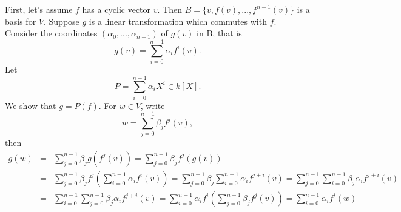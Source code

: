 \documentclass[12pt]{article}
\begin{document}
First, let's assume $f$ has a cyclic vector $v$. Then $B=\{v,f(v),...,f^{n-1}(v)\}$ is a basis for $V$. Suppose $g$ is a linear transformation which commutes with $f$. Consider the coordinates $(\alpha_{0},...,\alpha_{n-1})$ of $g(v)$ in B, that is $$g(v)=\sum_{i=0}^{n-1}\alpha_{i}f^{i}(v).$$ 
Let $$P=\sum_{i=0}^{n-1}\alpha_{i}X^{i} \in k[X].$$ We show that $g=P(f)$. 
For $w \in V$, write $$w=\sum_{j=0}^{n-1}\beta_{j}f^{j}(v),$$ then
\begin{eqnarray*}
g(w) &=& \sum_{j=0}^{n-1}\beta_{j}g(f^{j}(v)) = \sum_{j=0}^{n-1}\beta_{j}f^{j}(g(v)) \\
&=& \sum_{j=0}^{n-1}\beta_{j}f^{j}(\sum_{i=0}^{n-1}\alpha_{i}f^{i}(v))  
= \sum_{j=0}^{n-1}\beta_{j}\sum_{i=0}^{n-1}\alpha_{i}f^{j+i}(v)
= \sum_{j=0}^{n-1}\sum_{i=0}^{n-1}\beta_{j}\alpha_{i}f^{j+i}(v) \\
&=& \sum_{i=0}^{n-1}\sum_{j=0}^{n-1}\beta_{j}\alpha_{i}f^{j+i}(v)
= \sum_{i=0}^{n-1}\alpha_{i}f^{i}(\sum_{j=0}^{n-1}\beta_{j}f^{j}(v)) 
= \sum_{i=0}^{n-1}\alpha_{i}f^{i}(w)
\end{eqnarray*}
\end{document}
